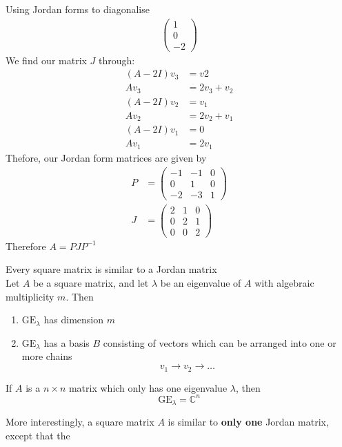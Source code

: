 \documentclass[journal, letterpaper]{IEEEtran}
\begin{document}
\begin{myboxg}{Using Jordan forms to diagonalise}
\begin{align*}
\begin{pmatrix}
                1 \\ 0 \\ -2
            \end{pmatrix}
        \end{align*}
        We find our matrix $J$ through:
        \begin{align*}
            (A - 2I)v_3 &= v2 \\ 
            Av_3 &= 2v_3 + v_2 \\
            (A - 2I)v_2 &= v_1 \\
            Av_2 &= 2v_2 + v_1 \\ 
            (A - 2I)v_1 &= 0 \\
            Av_1 &= 2v_1
        \end{align*}
        Thefore, our Jordan form matrices are given by
        \begin{align*}
            P &= \begin{pmatrix}
                -1 & -1 & 0 \\ 0 & 1 & 0 \\ -2 & -3 & 1
            \end{pmatrix} \\
            J &= \begin{pmatrix}
                2 & 1 & 0 \\0 & 2 & 1 \\ 0 & 0 & 2
            \end{pmatrix}
        \end{align*}
        Therefore $A = PJP^{-1}$
    \end{myboxg}
    \begin{myboxr}{Every square matrix is similar to a Jordan matrix} \\
        Let $A$ be a square matrix, and let $\lambda$ be an eigenvalue of $A$ with algebraic multiplicity $m$. Then
        \begin{enumerate}
            \item $\text{GE}_\lambda$ has dimension $m$
            \item $\text{GE}_\lambda$ has a basis $B$ consisting of vectors which can be arranged into one or more chains
            $$ v_1 \rightarrow v_2 \rightarrow \dots$$
        \end{enumerate}
        If $A$ is a $n \times n$ matrix which only has one eigenvalue $\lambda$, then
        $$ \text{GE}_\lambda = \mathbb{C}^n$$
    \end{myboxr}
    More interestingly, a square matrix $A$ is similar to \textbf{only one} Jordan matrix, except that the 
\end{document}
